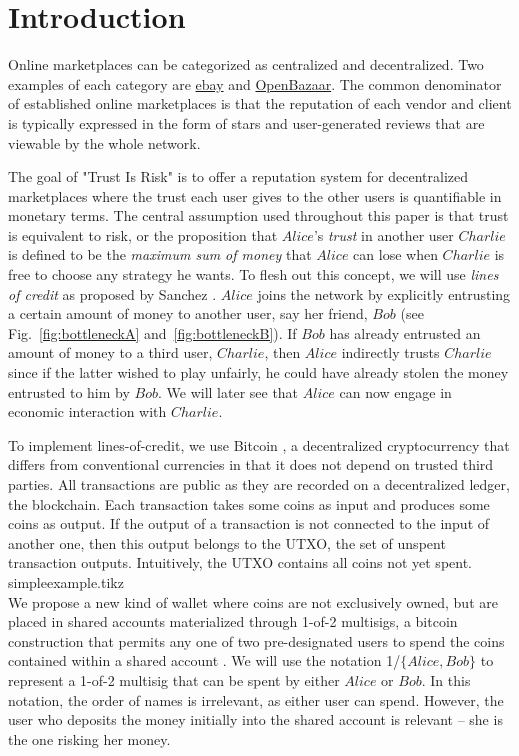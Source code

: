 \section{Introduction}
  Online marketplaces can be categorized as centralized and decentralized.
  Two examples of each category are \href{http://www.ebay.com}{ebay} and \href{https://openbazaar.org/}{OpenBazaar}.
  The common denominator of established online marketplaces is that the reputation of each vendor and client is typically
  expressed in the form of stars and user-generated reviews that are viewable by the whole network.

  The goal of "Trust Is Risk" is to offer a reputation system for decentralized marketplaces where the trust each user gives
  to the other users is quantifiable in monetary terms. The central assumption used throughout this paper is that trust is
  equivalent to risk, or the proposition that $Alice$'s \textit{trust} in another user $Charlie$ is defined to be the
  \textit{maximum sum of money} that $Alice$ can lose when $Charlie$ is free to choose any strategy he wants. To flesh out
  this concept, we will use \textit{lines of credit} as proposed by Sanchez \cite{loc}. $Alice$ joins the network by
  explicitly entrusting a certain amount of money to another user, say her friend, $Bob$ (see Fig.~\ref{fig:bottleneckA}
  and~\ref{fig:bottleneckB}). If $Bob$ has already entrusted an amount of money to a third user, $Charlie$, then $Alice$
  indirectly trusts $Charlie$ since if the latter wished to play unfairly, he could have already stolen the money entrusted to
  him by $Bob$. We will later see that $Alice$ can now engage in economic interaction with $Charlie$.

  To implement lines-of-credit, we use Bitcoin \cite{bitcoin}, a decentralized cryptocurrency that differs from conventional
  currencies in that it does not depend on trusted third parties. All transactions are public as they are recorded on a
  decentralized ledger, the blockchain. Each transaction takes some coins as input and produces some coins as output. If the
  output of a transaction is not connected to the input of another one, then this output belongs to the UTXO, the set of
  unspent transaction outputs. Intuitively, the UTXO contains all coins not yet spent.
  \medskip \ \\
  {simpleexample.tikz} \smallskip \ \\
  We propose a new kind of wallet where coins are not exclusively owned, but are placed in shared accounts materialized
  through 1-of-2 multisigs, a bitcoin construction that permits any one of two pre-designated users to spend the coins
  contained within a shared account \cite{masteringbitcoin}. We will use the notation 1/$\{Alice, Bob\}$ to represent a
  1-of-2 multisig that can be spent by either $Alice$ or $Bob$. In this notation, the order of names is irrelevant, as
  either user can spend. However, the user who deposits the money initially into the shared account is relevant -- she is the
  one risking her money.

